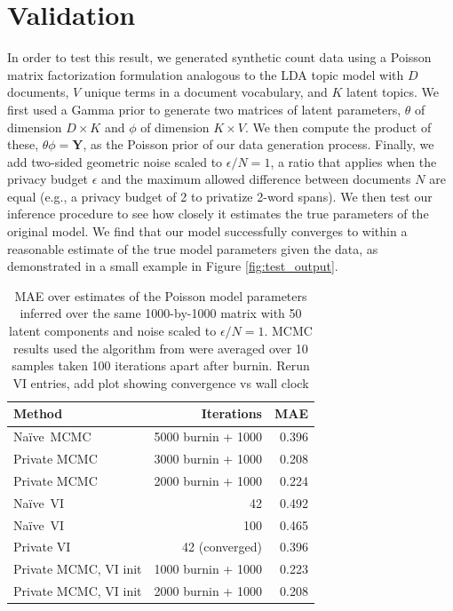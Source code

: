 \documentclass{article}
\newcommand{\Yten}{\pmb{Y}}
\newcommand{\Naive}{Na\"{i}ve}
\newcommand{\TODO}[1]{{\color{red} #1}}
\begin{document}
  \section{Validation}
  \label{sec:validation}

  In order to test this result, we generated synthetic count data using a
  Poisson matrix factorization formulation analogous to the LDA topic model
  \citep{blei2003latent} with $D$ documents, $V$ unique terms in a document
  vocabulary, and $K$ latent topics. We first used a Gamma prior to generate two
  matrices of latent parameters, $\theta$ of dimension $D \times K$ and $\phi$
  of dimension $K \times V$. We then compute the product of these, $\theta \phi
  = \Yten$, as the Poisson prior of our data generation process. Finally, we add
  two-sided geometric noise scaled to $\epsilon / N = 1$, a ratio that applies
  when the privacy budget $\epsilon$ and the maximum allowed difference between
  documents $N$ are equal (e.g., a privacy budget of 2 to privatize 2-word
  spans). We then test our inference procedure to see how closely it estimates
  the true parameters of the original model. We find that our model successfully
  converges to within a reasonable estimate of the true model parameters given
  the data, as demonstrated in a small example in Figure \ref{fig:test_output}.

  \begin{table}[t]
    \center
    \small
    \begin{tabular}{|l|r|r|}
      \hline
      Method & Iterations & MAE \\
      \hline
      \Naive~MCMC & 5000 burnin + 1000 & 0.396 \\
      Private MCMC & 3000 burnin + 1000 & 0.208 \\
      Private MCMC & 2000 burnin + 1000 & 0.224 \\
      \hline 
      \Naive~VI & 42 & 0.492 \\
      \Naive~VI & 100 & 0.465 \\
      Private VI & 42 (converged) & 0.396 \\
      \hline
      Private MCMC, VI init & 1000 burnin + 1000 & 0.223 \\
      Private MCMC, VI init & 2000 burnin + 1000 & 0.208 \\
      \hline
    \end{tabular}
    \vspace{0.2cm}
    \caption{MAE over estimates of the Poisson model parameters inferred over
    the same 1000-by-1000 matrix with 50 latent components and noise scaled to
    $\epsilon/N = 1$. MCMC results used the algorithm from
    \cite{schein2018locally} were averaged over 10 samples taken 100 iterations
    apart after burnin. \TODO{Rerun VI entries, add plot showing convergence vs
    wall clock}}
    \label{tab:results_synth}
  \end{table}
\end{document}

